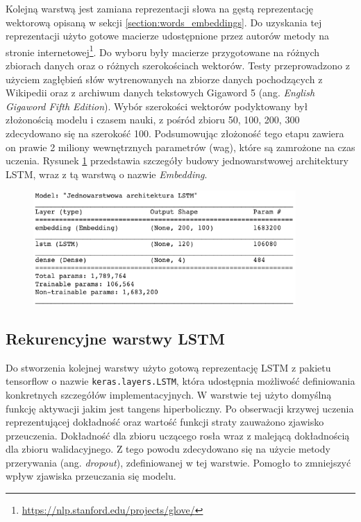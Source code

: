 Kolejną warstwą jest zamiana reprezentacji słowa na gęstą reprezentację wektorową opisaną w sekcji \ref{section:words_embeddings}. Do uzyskania tej reprezentacji użyto gotowe macierze udostępnione przez autorów metody na stronie internetowej\footnote{\url{https://nlp.stanford.edu/projects/glove/}}. Do wyboru były macierze przygotowane na różnych zbiorach danych oraz o różnych szerokościach wektorów. Testy przeprowadzono z użyciem zagłębień słów wytrenowanych na zbiorze danych pochodzących z Wikipedii oraz z archiwum danych tekstowych Gigaword 5 (ang. \textit{English Gigaword Fifth Edition}). Wybór szerokości wektorów podyktowany był złożonością modelu i czasem nauki, z pośród zbioru 50, 100, 200, 300 zdecydowano się na szerokość 100. Podsumowując złożoność tego etapu zawiera on prawie 2 miliony wewnętrznych parametrów (wag), które są zamrożone na czas uczenia. Rysunek \ref{rys:lstm_one_table} przedstawia szczegóły budowy jednowarstwowej architektury LSTM, wraz z tą warstwą o nazwie \textit{Embedding}.

\begin{figure}[t]
\centering\includegraphics[width=10cm]{figures/reports/lstm_one_table.png}
\label{rys:lstm_one_table}
\end{figure}

\subsection{Rekurencyjne warstwy LSTM}

Do stworzenia kolejnej warstwy użyto gotową reprezentację LSTM z pakietu tensorflow o nazwie \texttt{keras.layers.LSTM}, która udostępnia możliwość definiowania konkretnych szczegółów implementacyjnych. W warstwie tej użyto domyślną funkcję aktywacji jakim jest tangens hiperboliczny. Po obserwacji krzywej uczenia reprezentującej dokładność oraz wartość funkcji straty zauważono zjawisko przeuczenia. Dokładność dla zbioru uczącego rosła wraz z malejącą dokładnością dla zbioru walidacyjnego. Z tego powodu zdecydowano się na użycie metody przerywania (ang. \textit{dropout}), zdefiniowanej w tej warstwie. Pomogło to zmniejszyć wpływ zjawiska przeuczania się modelu.

